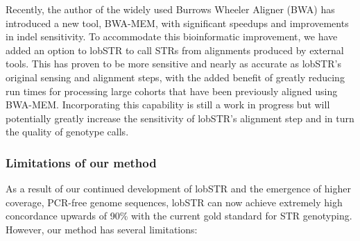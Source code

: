 Recently, the author of the widely used Burrows Wheeler Aligner (BWA) \cite{LiDurbin2009a} has introduced a new tool, BWA-MEM, with significant speedups and improvements in indel sensitivity. To accommodate this bioinformatic improvement, we have added an option to lobSTR to call STRs from alignments produced by external tools. This has proven to be more sensitive and nearly as accurate as lobSTR's original sensing and alignment steps, with the added benefit of greatly reducing run times for processing large cohorts that have been previously aligned using BWA-MEM. Incorporating this capability is still a work in progress but will potentially greatly increase the sensitivity of lobSTR's alignment step and in turn the quality of genotype calls.

\subsubsection{Limitations of our method}
As a result of our continued development of lobSTR and the emergence of higher coverage, PCR-free genome sequences, lobSTR can now achieve extremely high concordance upwards of 90\% with the current gold standard for STR genotyping. However, our method has several limitations:


